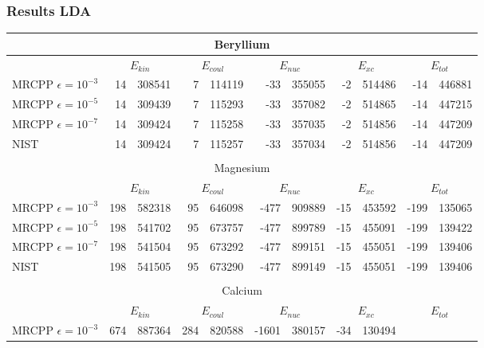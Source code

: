 \documentclass[mathserif]{beamer}
\begin{document}
\begin{frame}
	\frametitle{Results LDA}
	\begin{table}
		\tiny
		\centering
		\begin{tabular}{|l|r@{.}l|r@{.}l|r@{.}l|r@{.}l|r@{.}l|}
			\multicolumn{11}{c}{Beryllium}\\
			\hline
			&
			\multicolumn{2}{c|}{$E_{kin}$}&
			\multicolumn{2}{c|}{$E_{coul}$}&
			\multicolumn{2}{c|}{$E_{nuc}$}&
			\multicolumn{2}{c|}{$E_{xc}$}&
			\multicolumn{2}{c|}{$E_{tot}$}\\
			\hline
			MRCPP $\epsilon = 10^{-3}$&
			 14&308541&
			  7&114119&
			-33&355055&
			 -2&514486&
			-14&446881\\
			MRCPP $\epsilon = 10^{-5}$&
			 14&309439&
			  7&115293&
			-33&357082&
			 -2&514865&
			-14&447215\\
			MRCPP $\epsilon=10^{-7}$&
			 14&309424&
			  7&115258&
			-33&357035&
			 -2&514856&
			-14&447209\\
			\hline
			NIST&
			14&309424&
			7&115257&
			-33&357034&
			-2&514856&
			-14&447209\\
			\hline
			\multicolumn{11}{c}{}\\
			\multicolumn{11}{c}{Magnesium}\\
			\hline
			&
			\multicolumn{2}{c|}{$E_{kin}$}&
			\multicolumn{2}{c|}{$E_{coul}$}&
			\multicolumn{2}{c|}{$E_{nuc}$}&
			\multicolumn{2}{c|}{$E_{xc}$}&
			\multicolumn{2}{c|}{$E_{tot}$}\\
			\hline
			MRCPP $\epsilon=10^{-3}$&
			 198&582318&
			  95&646098&
			-477&909889&
			 -15&453592&
			-199&135065\\
			MRCPP $\epsilon=10^{-5}$&
			 198&541702&
			  95&673757&
			-477&899789&
			 -15&455091&
			-199&139422\\
			MRCPP $\epsilon=10^{-7}$&
			 198&541504&
			  95&673292&
			-477&899151&
			 -15&455051&
			-199&139406\\
			\hline
			NIST&
			 198&541505&
			  95&673290&
			-477&899149&
			 -15&455051&
			-199&139406\\
			\hline
			\multicolumn{11}{c}{}\\
			\multicolumn{11}{c}{Calcium}\\
			\hline
			&
			\multicolumn{2}{c|}{$E_{kin}$}&
			\multicolumn{2}{c|}{$E_{coul}$}&
			\multicolumn{2}{c|}{$E_{nuc}$}&
			\multicolumn{2}{c|}{$E_{xc}$}&
			\multicolumn{2}{c|}{$E_{tot}$}\\
			\hline
			MRCPP $\epsilon=10^{-3}$&
			  674&887364&
			  284&820588&
			-1601&380157&
			  -34&130494&

\end{tabular}
\end{table}
\end{frame}
\end{document}
